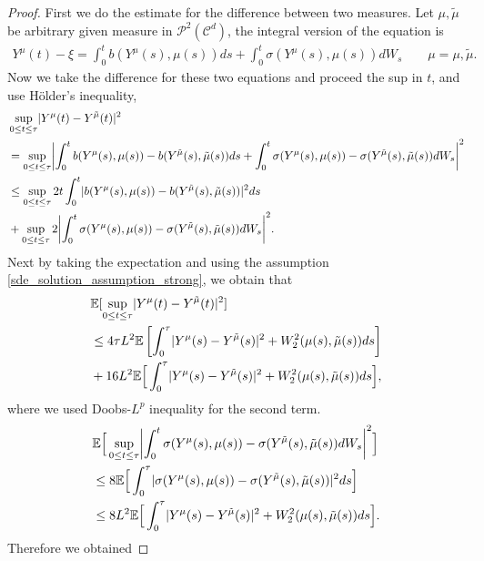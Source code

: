 \begin{proof}
First we do the estimate for the difference between two measures. Let $\mu ,\tilde{\mu }$ be arbitrary given measure in
 $\mathcal{P}^2(\mathcal{C}^{d} )$, the integral version of the equation is
 \begin{align*}
  Y^{\mu }(t) - \xi = \int_0^{t} b(Y^{\mu }(s),\mu(s) ) ds + \int_0^{t} \sigma(Y^{\mu }(s),\mu(s) ) dW_s \qquad \mu= \mu,\tilde{\mu} 
 .\end{align*}
 Now we take the difference for these two equations and proceed the sup in $t$, and use H\"older's inequality,
 \begin{align*}
   &\sup_{0\le t \le \tau }\abs{Y^{\mu }(t) - Y^{\tilde{\mu } }(t)}^2 \\
   &= \sup_{0\le t \le \tau}\abs*{\int_0^{t} b(Y^{\mu }(s),\mu(s) )- b(Y^{\tilde{\mu}}(s),\tilde{\mu}(s) ) ds + \int_0^{t} \sigma(Y^{\mu }(s),\mu(s) ) - \sigma (Y^{\tilde{\mu}}(s),\tilde{\mu}(s) ) dW_s}^2\\
   &\le \sup_{0\le t \le \tau } 2t \int_0^{t} \abs{b(Y^{\mu }(s),\mu(s) )- b(Y^{\tilde{\mu}}(s),\tilde{\mu}(s) )}^2 ds \\
   &+ \sup_{0\le t \le \tau }2 \abs*{\int_0^{t} \sigma(Y^{\mu }(s),\mu(s) ) - \sigma (Y^{\tilde{\mu}}(s),\tilde{\mu}(s) ) dW_s}^2 
 .\end{align*}
 Next by taking the expectation and using the assumption \autoref{sde_solution_assumption_strong}, we obtain that
 \begin{align*}
   &\mathbb{E}[\sup_{0\le t \le \tau }\lvert Y^{\mu }(t) - Y^{\tilde{\mu } }(t)\rvert^2] \\
   &\le 4\tau  L^2 \mathbb{E}\left[\int_0^{\tau } \lvert Y^{\mu }(s) - Y^{\tilde{\mu } }(s)  \rvert^2 + W_2^2(\mu(s) ,\tilde{\mu}(s) ) ds \right]\\
   &+ 16 L^2 \mathbb{E}\Big[\int_0^{\tau } \lvert Y^{\mu}(s) - Y^{\tilde{\mu } }(s)  \rvert^2 + W_2^2(\mu(s),\tilde{\mu }(s) )  ds\Big]
 ,\end{align*}
 where we used Doobs-$L^{p} $ inequality for the second term.
 \begin{align*}
   &\E\Big[\sup_{0\le t\le \tau }\abs*{\int_0^{t} \sigma(Y^{\mu }(s),\mu(s) ) - \sigma (Y^{\tilde{\mu}}(s),\tilde{\mu}(s) ) dW_s}^2\Big] \\
   &\le 8 \E\Big[\int_0^{\tau } \abs{\sigma(Y^{\mu }(s),\mu(s) ) - \sigma (Y^{\tilde{\mu}}(s),\tilde{\mu}(s) )}^2 ds\Big]\\
   &\le 8 L^2\E\Big[\int_0^{\tau } \abs{Y^{\mu}(s) - Y^{\tilde{\mu } }(s)  }^2 + W_2^2(\mu(s),\tilde{\mu }(s) )  ds\Big]
 .\end{align*}
Therefore we obtained

\end{proof}
